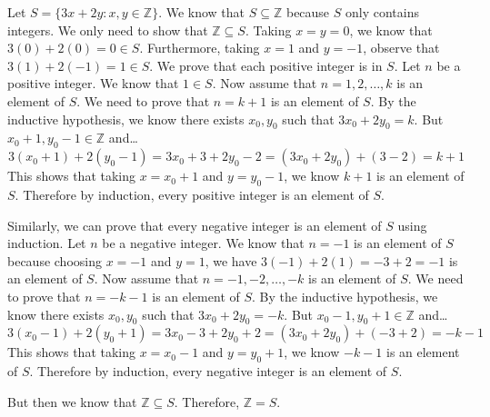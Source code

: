\documentclass[11pt,letterpaper]{article}
\begin{document}
\sol Let $S= \{ 3x + 2y \colon x, y \in \mathbb{Z} \}$. We know that $S \subseteq \mathbb{Z}$ because $S$ only contains integers. We only need to show that $\mathbb{Z} \subseteq S$. Taking $x= y= 0$, we know that $3(0) + 2(0)= 0 \in S$. Furthermore, taking $x= 1$ and $y= -1$, observe that $3(1) + 2(-1)= 1 \in S$. We prove that each positive integer is in $S$. Let $n$ be a positive integer. We know that $1 \in S$. Now assume that $n= 1, 2, \ldots, k$ is an element of $S$. We need to prove that $n= k + 1$ is an element of $S$. By the inductive hypothesis, we know there exists $x_0, y_0$ such that $3x_0 + 2y_0= k$. But $x_0 + 1, y_0 - 1 \in \mathbb{Z}$ and\dots
	\[
	3(x_0 + 1) + 2(y_0 - 1)= 3x_0 + 3 + 2y_0 - 2= (3x_0 + 2y_0) + (3 - 2)= k + 1
	\]
This shows that taking $x= x_0 + 1$ and $y= y_0 - 1$, we know $k + 1$ is an element of $S$. Therefore by induction, every positive integer is an element of $S$. \pspace

Similarly, we can prove that every negative integer is an element of $S$ using induction. Let $n$ be a negative integer. We know that $n= -1$ is an element of $S$ because choosing $x= -1$ and $y= 1$, we have $3(-1) + 2(1)= -3 + 2= -1$ is an element of $S$. Now assume that $n= -1, -2, \ldots, -k$ is an element of $S$. We need to prove that $n= -k - 1$ is an element of $S$. By the inductive hypothesis, we know there exists $x_0, y_0$ such that $3x_0 + 2y_0= -k$. But $x_0 - 1, y_0 + 1 \in \mathbb{Z}$ and\dots
	\[
	3(x_0 - 1) + 2(y_0 + 1)= 3x_0 - 3 + 2y_0 + 2= (3x_0 + 2y_0) + (-3 + 2)= -k - 1
	\]
This shows that taking $x= x_0 - 1$ and $y= y_0 + 1$, we know $-k - 1$ is an element of $S$. Therefore by induction, every negative integer is an element of $S$. \pspace

But then we know that $\mathbb{Z} \subseteq S$. Therefore, $\mathbb{Z}= S$. 
\end{document}
